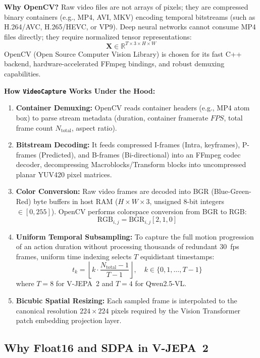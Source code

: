 \documentclass[11pt, a4paper]{article}
\begin{document}
\begin{explainbox}
\textbf{Why OpenCV?}
Raw video files are not arrays of pixels; they are compressed binary containers (e.g., MP4, AVI, MKV) encoding temporal bitstreams (such as H.264/AVC, H.265/HEVC, or VP9). Deep neural networks cannot consume MP4 files directly; they require normalized tensor representations:
$$\mathbf{X} \in \mathbb{R}^{T \times 3 \times H \times W}$$
OpenCV (Open Source Computer Vision Library) is chosen for its fast C++ backend, hardware-accelerated FFmpeg bindings, and robust demuxing capabilities.

\textbf{How \texttt{VideoCapture} Works Under the Hood:}
\begin{enumerate}[leftmargin=1.2em]
    \item \textbf{Container Demuxing:} OpenCV reads container headers (e.g., MP4 atom box) to parse stream metadata (duration, container framerate $FPS$, total frame count $N_{\text{total}}$, aspect ratio).
    \item \textbf{Bitstream Decoding:} It feeds compressed I-frames (Intra, keyframes), P-frames (Predicted), and B-frames (Bi-directional) into an FFmpeg codec decoder, decompressing Macroblocks/Transform blocks into uncompressed planar YUV420 pixel matrices.
    \item \textbf{Color Conversion:} Raw video frames are decoded into BGR (Blue-Green-Red) byte buffers in host RAM ($H \times W \times 3$, unsigned 8-bit integers $\in [0, 255]$). OpenCV performs colorspace conversion from BGR to RGB:
    $$\text{RGB}_{i,j} = \text{BGR}_{i,j}[2, 1, 0]$$
    \item \textbf{Uniform Temporal Subsampling:} To capture the full motion progression of an action duration without processing thousands of redundant 30~fps frames, uniform time indexing selects $T$ equidistant timestamps:
    $$t_k = \left\lfloor k \cdot \frac{N_{\text{total}} - 1}{T - 1} \right\rfloor, \quad k \in \{0, 1, \ldots, T-1\}$$
    where $T=8$ for V-JEPA~2 and $T=4$ for Qwen2.5-VL.
    \item \textbf{Bicubic Spatial Resizing:} Each sampled frame is interpolated to the canonical resolution $224 \times 224$ pixels required by the Vision Transformer patch embedding projection layer.
\end{enumerate}
\end{explainbox}

\subsection{Why Float16 and SDPA in V-JEPA~2}
\end{document}

